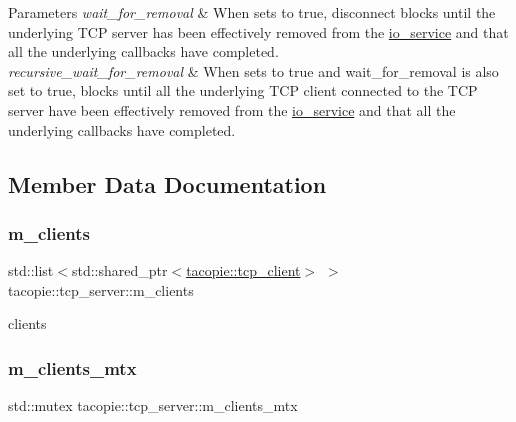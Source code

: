 \begin{DoxyParams}{Parameters}
{\em wait\+\_\+for\+\_\+removal} & When sets to true, disconnect blocks until the underlying T\+CP server has been effectively removed from the \hyperlink{classtacopie_1_1io__service}{io\+\_\+service} and that all the underlying callbacks have completed. \\
\hline
{\em recursive\+\_\+wait\+\_\+for\+\_\+removal} & When sets to true and wait\+\_\+for\+\_\+removal is also set to true, blocks until all the underlying T\+CP client connected to the T\+CP server have been effectively removed from the \hyperlink{classtacopie_1_1io__service}{io\+\_\+service} and that all the underlying callbacks have completed. \\
\hline
\end{DoxyParams}


\subsection{Member Data Documentation}
\mbox{\label{classtacopie_1_1tcp__server_ab3e475c59504150c4f3dc68bdb932670}} 
\subsubsection{\texorpdfstring{m\+\_\+clients}{m\_clients}}
{\footnotesize\ttfamily std\+::list$<$std\+::shared\+\_\+ptr$<$\hyperlink{classtacopie_1_1tcp__client}{tacopie\+::tcp\+\_\+client}$>$ $>$ tacopie\+::tcp\+\_\+server\+::m\+\_\+clients\hspace{0.3cm}{\ttfamily [private]}}

clients \mbox{\label{classtacopie_1_1tcp__server_ad4ee31fe6e01a38bb2a3b11a0f29ab9a}} 
\subsubsection{\texorpdfstring{m\+\_\+clients\+\_\+mtx}{m\_clients\_mtx}}
{\footnotesize\ttfamily std\+::mutex tacopie\+::tcp\+\_\+server\+::m\+\_\+clients\+\_\+mtx\hspace{0.3cm}{\ttfamily [private]}}

